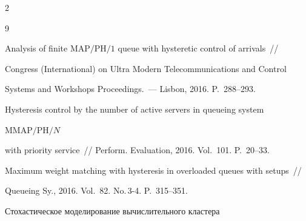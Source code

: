  \begin{multicols}{2}





\renewcommand{\bibname}{\protect\rmfamily Литература}







{\small\frenchspacing


{%


\begin{thebibliography}{9}









Analysis of finite ${\mathrm{MAP}/\mathrm{PH}/1}$ queue with hysteretic control of arrivals~// 


 Congress (International) on Ultra Modern Telecommunications and Control 


Systems and Workshops Proceedings.~--- Lisbon, 2016.  P.~288--293.












Hysteresis control by the number of active servers in queueing system 


$\mathrm{MMAP}/\mathrm{PH}/N$


with priority service~// Perform. Evaluation, 2016. Vol.~101. P.~20--33.









Maximum weight matching with hysteresis in overloaded queues with setups~// 


Queueing Sy., 2016. Vol.~82. No.\,3-4. P.~315--351.









Стохастическое моделирование вычислительного кластера 



\end{thebibliography}}}
\end{multicols}
